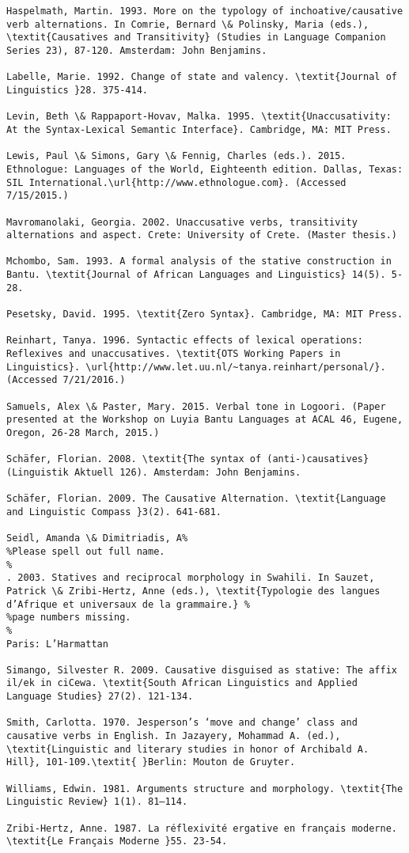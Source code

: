 \documentclass[output=paper]{langsci/langscibook}
\begin{document}
\begin{verbatim}
Haspelmath, Martin. 1993. More on the typology of inchoative/causative verb alternations. In Comrie, Bernard \& Polinsky, Maria (eds.), \textit{Causatives and Transitivity} (Studies in Language Companion Series 23), 87-120. Amsterdam: John Benjamins.

Labelle, Marie. 1992. Change of state and valency. \textit{Journal of Linguistics }28. 375-414. 

Levin, Beth \& Rappaport-Hovav, Malka. 1995. \textit{Unaccusativity: At the Syntax-Lexical Semantic Interface}. Cambridge, MA: MIT Press.

Lewis, Paul \& Simons, Gary \& Fennig, Charles (eds.). 2015. Ethnologue: Languages of the World, Eighteenth edition. Dallas, Texas: SIL International.\url{http://www.ethnologue.com}. (Accessed 7/15/2015.)

Mavromanolaki, Georgia. 2002. Unaccusative verbs, transitivity alternations and aspect. Crete: University of Crete. (Master thesis.)

Mchombo, Sam. 1993. A formal analysis of the stative construction in Bantu. \textit{Journal of African Languages and Linguistics} 14(5). 5-28.

Pesetsky, David. 1995. \textit{Zero Syntax}. Cambridge, MA: MIT Press.

Reinhart, Tanya. 1996. Syntactic effects of lexical operations: Reflexives and unaccusatives. \textit{OTS Working Papers in Linguistics}. \url{http://www.let.uu.nl/~tanya.reinhart/personal/}. (Accessed 7/21/2016.)

Samuels, Alex \& Paster, Mary. 2015. Verbal tone in Logoori. (Paper presented at the Workshop on Luyia Bantu Languages at ACAL 46, Eugene, Oregon, 26-28 March, 2015.)

Schäfer, Florian. 2008. \textit{The syntax of (anti-)causatives} (Linguistik Aktuell 126). Amsterdam: John Benjamins.

Schäfer, Florian. 2009. The Causative Alternation. \textit{Language and Linguistic Compass }3(2). 641-681.

Seidl, Amanda \& Dimitriadis, A%
%Please spell out full name. 
%
. 2003. Statives and reciprocal morphology in Swahili. In Sauzet, Patrick \& Zribi-Hertz, Anne (eds.), \textit{Typologie des langues d’Afrique et universaux de la grammaire.} %
%page numbers missing. 
%
Paris: L’Harmattan 

Simango, Silvester R. 2009. Causative disguised as stative: The affix il/ek in ciCewa. \textit{South African Linguistics and Applied Language Studies} 27(2). 121-134.

Smith, Carlotta. 1970. Jesperson’s ‘move and change’ class and causative verbs in English. In Jazayery, Mohammad A. (ed.), \textit{Linguistic and literary studies in honor of Archibald A. Hill}, 101-109.\textit{ }Berlin: Mouton de Gruyter.

Williams, Edwin. 1981. Arguments structure and morphology. \textit{The Linguistic Review} 1(1). 81–114.

Zribi-Hertz, Anne. 1987. La réflexivité ergative en français moderne. \textit{Le Français Moderne }55. 23-54.


\end{verbatim}
 

\printbibliography[heading=subbibliography,notkeyword=this]
\end{document}

